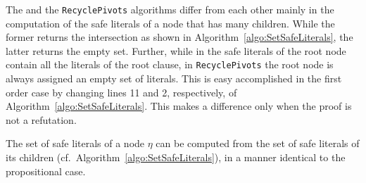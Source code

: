 The {\RecyclePivotsIntersection} and the \texttt{RecyclePivots} algorithms differ from each other mainly in the
computation of the safe literals of a node that has many children. While the former 
returns the intersection as shown in Algorithm~\ref{algo:SetSafeLiterals}, the latter
returns the empty set. 
Further, while in \RecyclePivotsIntersection the safe literals of the root node contain all the literals of the root clause, in \texttt{RecyclePivots} the root node is always assigned an empty set of literals. 
This is easy accomplished in the first order case by changing lines 11 and 2, respectively, of Algorithm~\ref{algo:SetSafeLiterals}.
This makes a difference only when the proof is not a refutation.

The set of safe literals of a node $\eta$ can be computed from the set of safe literals of its children (cf.\ Algorithm~\ref{algo:SetSafeLiterals}), in a manner identical to the propositional case.






